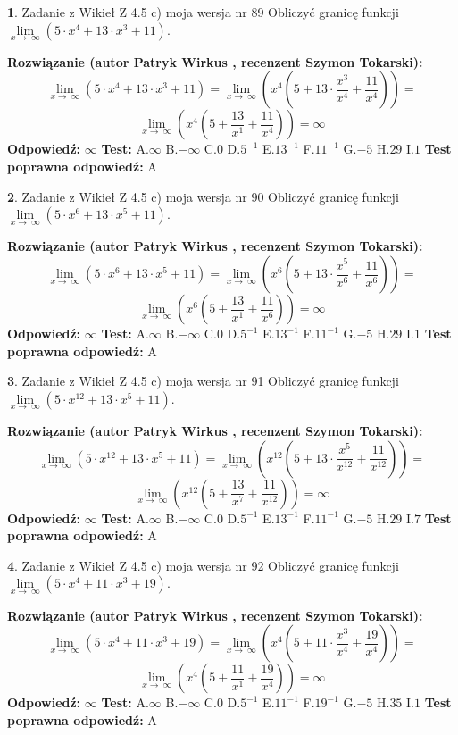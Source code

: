 \documentclass[12pt, a4paper]{article}
\theoremstyle{definition} %
\newtheorem{zad}{}
\newcommand{\zadStart}[1]{\begin{zad}#1\newline}
\newcommand{\zadStop}{\end{zad}}
\newcommand{\rozwStart}[2]{\noindent \textbf{Rozwiązanie (autor #1 , recenzent #2): }\newline}
\newcommand{\rozwStop}{\newline}
\newcommand{\odpStart}{\noindent \textbf{Odpowiedź:}\newline}
\newcommand{\odpStop}{\newline}
\newcommand{\testStart}{\noindent \textbf{Test:}\newline}
\newcommand{\testStop}{\newline}
\newcommand{\kluczStart}{\noindent \textbf{Test poprawna odpowiedź:}\newline}
\newcommand{\kluczStop}{\newline}
\begin{document}
\zadStart{Zadanie z Wikieł Z 4.5 c) moja wersja nr 89}
Obliczyć granicę funkcji  $\lim\limits_{x\to\ \infty}(5 \cdot x^{4}+13 \cdot x^{3}+11)$.
\zadStop
\rozwStart{Patryk Wirkus}{Szymon Tokarski}
$$\lim\limits_{x\to\ \infty}(5 \cdot x^{4}+13 \cdot x^{3}+11) = \lim\limits_{x\to\ \infty}(x^{4}(5 +13 \cdot \frac{x^{3}}{x^{4}}+\frac{11}{x^{4}})) =$$ $$\lim\limits_{x\to\ \infty}(x^{4}(5 +\frac{13}{x^{1}}+\frac{11}{x^{4}})) =\infty$$
\rozwStop
\odpStart
$\infty$
\odpStop
\testStart
A.$\infty$ B.$-\infty$ C.$0$ D.$5^{-1}$ E.$13^{-1}$
F.$11^{-1}$ G.$-5$
H.$29$
I.$1$
\testStop
\kluczStart
A
\kluczStop



\zadStart{Zadanie z Wikieł Z 4.5 c) moja wersja nr 90}
Obliczyć granicę funkcji  $\lim\limits_{x\to\ \infty}(5 \cdot x^{6}+13 \cdot x^{5}+11)$.
\zadStop
\rozwStart{Patryk Wirkus}{Szymon Tokarski}
$$\lim\limits_{x\to\ \infty}(5 \cdot x^{6}+13 \cdot x^{5}+11) = \lim\limits_{x\to\ \infty}(x^{6}(5 +13 \cdot \frac{x^{5}}{x^{6}}+\frac{11}{x^{6}})) =$$ $$\lim\limits_{x\to\ \infty}(x^{6}(5 +\frac{13}{x^{1}}+\frac{11}{x^{6}})) =\infty$$
\rozwStop
\odpStart
$\infty$
\odpStop
\testStart
A.$\infty$ B.$-\infty$ C.$0$ D.$5^{-1}$ E.$13^{-1}$
F.$11^{-1}$ G.$-5$
H.$29$
I.$1$
\testStop
\kluczStart
A
\kluczStop



\zadStart{Zadanie z Wikieł Z 4.5 c) moja wersja nr 91}
Obliczyć granicę funkcji  $\lim\limits_{x\to\ \infty}(5 \cdot x^{12}+13 \cdot x^{5}+11)$.
\zadStop
\rozwStart{Patryk Wirkus}{Szymon Tokarski}
$$\lim\limits_{x\to\ \infty}(5 \cdot x^{12}+13 \cdot x^{5}+11) = \lim\limits_{x\to\ \infty}(x^{12}(5 +13 \cdot \frac{x^{5}}{x^{12}}+\frac{11}{x^{12}})) =$$ $$\lim\limits_{x\to\ \infty}(x^{12}(5 +\frac{13}{x^{7}}+\frac{11}{x^{12}})) =\infty$$
\rozwStop
\odpStart
$\infty$
\odpStop
\testStart
A.$\infty$ B.$-\infty$ C.$0$ D.$5^{-1}$ E.$13^{-1}$
F.$11^{-1}$ G.$-5$
H.$29$
I.$7$
\testStop
\kluczStart
A
\kluczStop



\zadStart{Zadanie z Wikieł Z 4.5 c) moja wersja nr 92}
Obliczyć granicę funkcji  $\lim\limits_{x\to\ \infty}(5 \cdot x^{4}+11 \cdot x^{3}+19)$.
\zadStop
\rozwStart{Patryk Wirkus}{Szymon Tokarski}
$$\lim\limits_{x\to\ \infty}(5 \cdot x^{4}+11 \cdot x^{3}+19) = \lim\limits_{x\to\ \infty}(x^{4}(5 +11 \cdot \frac{x^{3}}{x^{4}}+\frac{19}{x^{4}})) =$$ $$\lim\limits_{x\to\ \infty}(x^{4}(5 +\frac{11}{x^{1}}+\frac{19}{x^{4}})) =\infty$$
\rozwStop
\odpStart
$\infty$
\odpStop
\testStart
A.$\infty$ B.$-\infty$ C.$0$ D.$5^{-1}$ E.$11^{-1}$
F.$19^{-1}$ G.$-5$
H.$35$
I.$1$
\testStop
\kluczStart
A
\kluczStop
\end{document}
